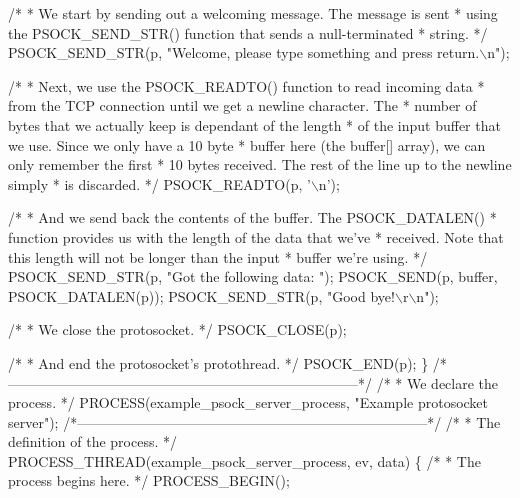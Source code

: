 \begin{DoxyCodeInclude}
  \textcolor{comment}{/*}
\textcolor{comment}{   * We start by sending out a welcoming message. The message is sent}
\textcolor{comment}{   * using the PSOCK\_SEND\_STR() function that sends a null-terminated}
\textcolor{comment}{   * string.}
\textcolor{comment}{   */}
  PSOCK\_SEND\_STR(p, \textcolor{stringliteral}{"Welcome, please type something and press return.\(\backslash\)n"});
  
  \textcolor{comment}{/*}
\textcolor{comment}{   * Next, we use the PSOCK\_READTO() function to read incoming data}
\textcolor{comment}{   * from the TCP connection until we get a newline character. The}
\textcolor{comment}{   * number of bytes that we actually keep is dependant of the length}
\textcolor{comment}{   * of the input buffer that we use. Since we only have a 10 byte}
\textcolor{comment}{   * buffer here (the buffer[] array), we can only remember the first}
\textcolor{comment}{   * 10 bytes received. The rest of the line up to the newline simply}
\textcolor{comment}{   * is discarded.}
\textcolor{comment}{   */}
  PSOCK\_READTO(p, \textcolor{charliteral}{'\(\backslash\)n'});
  
  \textcolor{comment}{/*}
\textcolor{comment}{   * And we send back the contents of the buffer. The PSOCK\_DATALEN()}
\textcolor{comment}{   * function provides us with the length of the data that we've}
\textcolor{comment}{   * received. Note that this length will not be longer than the input}
\textcolor{comment}{   * buffer we're using.}
\textcolor{comment}{   */}
  PSOCK\_SEND\_STR(p, \textcolor{stringliteral}{"Got the following data: "});
  PSOCK\_SEND(p, buffer, PSOCK\_DATALEN(p));
  PSOCK\_SEND\_STR(p, \textcolor{stringliteral}{"Good bye!\(\backslash\)r\(\backslash\)n"});

  \textcolor{comment}{/*}
\textcolor{comment}{   * We close the protosocket.}
\textcolor{comment}{   */}
  PSOCK\_CLOSE(p);

  \textcolor{comment}{/*}
\textcolor{comment}{   * And end the protosocket's protothread.}
\textcolor{comment}{   */}
  PSOCK\_END(p);
\}
\textcolor{comment}{/*---------------------------------------------------------------------------*/}
\textcolor{comment}{/*}
\textcolor{comment}{ * We declare the process.}
\textcolor{comment}{ */}
PROCESS(example\_psock\_server\_process, \textcolor{stringliteral}{"Example protosocket server"});
\textcolor{comment}{/*---------------------------------------------------------------------------*/}
\textcolor{comment}{/*}
\textcolor{comment}{ * The definition of the process.}
\textcolor{comment}{ */}
PROCESS\_THREAD(example\_psock\_server\_process, ev, data)
\{
  \textcolor{comment}{/*}
\textcolor{comment}{   * The process begins here.}
\textcolor{comment}{   */}
  PROCESS\_BEGIN();


\end{DoxyCodeInclude}
